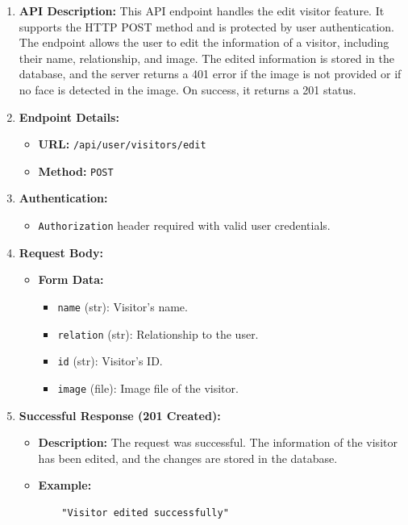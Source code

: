 \documentclass[a4 paper, 12pt]{article}
\begin{document}
\begin{enumerate}
  \item \textbf{API Description:} This API endpoint handles the edit visitor feature. It supports the HTTP POST method and is protected by user authentication. The endpoint allows the user to edit the information of a visitor, including their name, relationship, and image. The edited information is stored in the database, and the server returns a 401 error if the image is not provided or if no face is detected in the image. On success, it returns a 201 status.

  \item \textbf{Endpoint Details:}
  \begin{itemize}
    \item \textbf{URL:} \texttt{/api/user/visitors/edit}
    \item \textbf{Method:} \texttt{POST}
  \end{itemize}

  \item \textbf{Authentication:}
  \begin{itemize}
    \item \texttt{Authorization} header required with valid user credentials.
  \end{itemize}

  \item \textbf{Request Body:}
  \begin{itemize}
    \item \textbf{Form Data:}
    \begin{itemize}
      \item \texttt{name} (str): Visitor's name.
      \item \texttt{relation} (str): Relationship to the user.
      \item \texttt{id} (str): Visitor's ID.
      \item \texttt{image} (file): Image file of the visitor.
    \end{itemize}
  \end{itemize}

  \item \textbf{Successful Response (201 Created):}
  \begin{itemize}
    \item \textbf{Description:} The request was successful. The information of the visitor has been edited, and the changes are stored in the database.
    \item \textbf{Example:}
    \begin{verbatim}
    "Visitor edited successfully"
    \end{verbatim}
  \end{itemize}


\end{enumerate}
\end{document}
